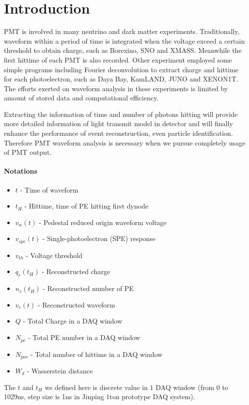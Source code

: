 \section{Introduction} %
\label{sec:Introduction}
PMT is involved in many neutrino and dark matter experiments. Traditionally, waveform within a period of time is integrated when the voltage exceed a certain threshold to obtain charge, such as Borexino\cite{lagomarsino_gateless_1999}, SNO\cite{dunger_event_2019} and XMASS\cite{abe_xmass_2013}. Meanwhile the first hittime of each PMT is also recorded. Other experiment employed some simple programs including Fourier deconvolution to extract charge and hittime for each photoelectron, such as Daya Bay\cite{huang_flash_2018}, KamLAND\cite{the_kamland_collaboration_production_2010}, JUNO\cite{zhang_comparison_2019} and XENON1T\cite{aprile_xenon1t_2019}. The efforts exerted on waveform analysis in these experiments is limited by amount of stored data and computational efficiency. 

Extracting the information of time and number of photons hitting will provide more detailed information of light transmit model in detector and will finally enhance the performance of event reconstruction, even particle identification. Therefore PMT waveform analysis is necessary when we pursue completely usage of PMT output. 

\paragraph{Notations}
\begin{itemize}
    \item $t$ - Time of waveform
    \item $t_{H}$ - Hittime, time of PE hitting first dynode
    \item $v_{w}(t)$ - Pedestal reduced origin waveform voltage
    \item $v_{spe}(t)$ - Single-photoelectron (SPE) response
    \item $v_{th}$ - Voltage threshold
    \item $q_{r}(t_{H})$ - Reconstructed charge
    \item $n_{r}(t_{H})$ - Reconstructed number of PE
    \item $v_{r}(t)$ - Reconstructed waveform
    \item $Q$ - Total Charge in a DAQ window
    \item $N_{pe}$ - Total PE number in a DAQ window
    \item $N_{pos}$ - Total number of hittime in a DAQ window
    \item $W_{d}$ - Wasserstein distance
\end{itemize}
The $t$ and $t_{H}$ we defined here is discrete value in 1 DAQ window (from 0 to 1029ns, step size is 1ns in Jinping 1ton prototype DAQ system). 
